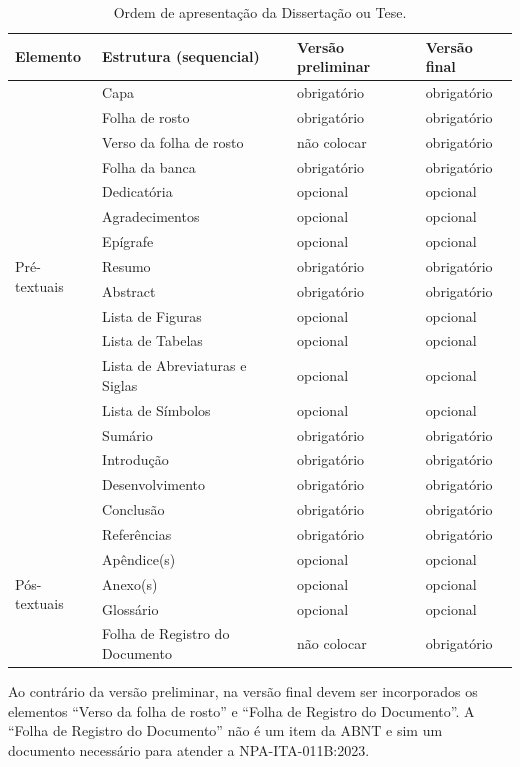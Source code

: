 \begin{table}[htbp]
\centering
\caption{Ordem de apresentação da Dissertação ou Tese.}
\label{tab:ordem-apresentacao}
\begin{tabular}{p{2.5cm}p{7.3cm}p{2.2cm}p{2.2cm}}
\toprule
Elemento & Estrutura (sequencial) & Versão preliminar & Versão final \\
\midrule
\multirow{15}{*}{Pré-textuais} & Capa & obrigatório & obrigatório \\
 & Folha de rosto & obrigatório & obrigatório \\
 & Verso da folha de rosto & não colocar & obrigatório \\
 & Folha da banca & obrigatório & obrigatório \\
 & Dedicatória & opcional & opcional \\
 & Agradecimentos & opcional & opcional \\
 & Epígrafe & opcional & opcional \\
 & Resumo & obrigatório & obrigatório \\
 & Abstract & obrigatório & obrigatório \\
 & Lista de Figuras & opcional & opcional \\
 & Lista de Tabelas & opcional & opcional \\
 & Lista de Abreviaturas e Siglas & opcional & opcional \\
 & Lista de Símbolos & opcional & opcional \\
 & Sumário & obrigatório & obrigatório \\
\midrule
\multirow{3}{*}{Textuais} & Introdução & obrigatório & obrigatório \\
 & Desenvolvimento & obrigatório & obrigatório \\
 & Conclusão & obrigatório & obrigatório \\
\midrule
\multirow{5}{*}{Pós-textuais} & Referências & obrigatório & obrigatório \\
 & Apêndice(s) & opcional & opcional \\
 & Anexo(s) & opcional & opcional \\
 & Glossário & opcional & opcional \\
 & Folha de Registro do Documento & não colocar & obrigatório \\
\bottomrule
\end{tabular}
\end{table}

Ao contrário da versão preliminar, na versão final devem ser incorporados os elementos ``Verso da folha de rosto'' e ``Folha de Registro do Documento''. A ``Folha de Registro do Documento'' não é um item da ABNT e sim um documento necessário para atender a NPA-ITA-011B:2023.


